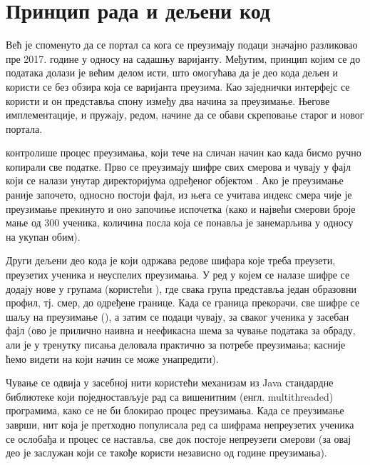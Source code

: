 \section{Принцип рада и дељени код}

Већ је споменуто да се портал са кога се преузимају подаци значајно разликовао пре 2017. године у односу на садашњу варијанту. Међутим, принцип којим се до података долази је већим делом исти, што омогућава да је део кода дељен и користи се без обзира која се варијанта преузима. Као заједнички интерфејс се користи  и он представља спону између два начина за преузимање. Његове имплементације,  и  пружају, редом, начине да се обави скреповање старог и новог портала.

 контролише процес преузимања, који тече на сличан начин као када бисмо ручно копирали све податке. Прво се преузимају шифре свих смерова и чувају у фајл  који се налази унутар директоријума одређеног  објектом . Ако је преузимање раније започето, односно постоји  фајл, из њега се учитава индекс смера чије је преузимање прекинуто и оно започиње испочетка (како и највећи смерови броје мање од 300 ученика, количина посла која се понавља је занемарљива у односу на укупан обим). 

Други дељени део кода је  који одржава редове шифара које треба преузети, преузетих ученика и неуспелих преузимања. У ред у којем се налазе шифре се додају нове у групама (користећи ), где свака група представља један образовни профил, тј. смер, до одређене границе. Када се граница прекорачи, све шифре се шаљу на преузимање (), а затим се подаци чувају, за сваког ученика у засебан фајл (ово је прилично наивна и неефикасна шема за чување података за обраду, али је у тренутку писања деловала практично за потребе преузимања; касније ћемо видети на који начин се може унапредити). 

Чување се одвија у засебној нити користећи  механизам из Java стандардне библиотеке који поједностављује рад са вишенитним (енгл. multithreaded) програмима, како се не би блокирао процес преузимања. Када се преузимање заврши, нит која је претходно популисала ред са шифрама непреузетих ученика се ослобађа и процес се наставља, све док постоје непреузети смерови (за овај део је заслужан  који се такође користи независно од године преузимања).



